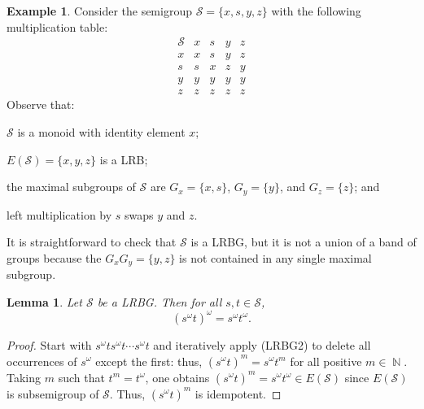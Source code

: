 \documentclass[11pt, oneside, reqno]{amsart}
\newtheorem{lemma}[theorem]{Lemma}
\theoremstyle{definition}
\newtheorem{example}[theorem]{Example}
\numberwithin{equation}{section}
\DeclareMathOperator{\NN}{\mathbb{N}}
\def \SS{{\mathcal{S}}}
\begin{document}
\begin{example}
    \label{ex:not-strict}
    Consider the semigroup $\SS = \{x, s, y, z\}$ with the following multiplication table:
    \begin{equation*}
        \begin{array}{c|cccc}
            \SS & x & s & y & z \\ \hline
            x & x & s & y & z \\
            s & s & x & z & y \\
            y & y & y & y & y \\
            z & z & z & z & z
        \end{array}
    \end{equation*}
    Observe that:
    \begin{enumerate*}[label=(\roman*)]
        \item
            $\SS$ is a monoid with identity element $x$;

        \item
            $E(\SS) = \{x, y, z\}$ is a LRB;

        \item
            the maximal subgroups of $\SS$ are
            $G_{x} = \{x, s\}$, $G_{y} = \{y\}$, and $G_{z} = \{z\}$; and

        \item
            left multiplication by $s$ swaps $y$ and $z$.
    \end{enumerate*}
    It is straightforward to check that $\SS$ is a LRBG, but it is not a union
    of a band of groups because the $G_{x} G_{y} = \{y, z\}$ is not contained in
    any single maximal subgroup.
\end{example}

\begin{lemma}
    Let $\SS$ be a LRBG. Then for all $s, t \in \SS$,
    \begin{equation}
        \label{(s^omega-t)^omega}
        (s^\omega t)^\omega = s^\omega t^\omega.
    \end{equation}
\end{lemma}

\begin{proof}
    Start with $s^\omega t s^\omega t \cdots s^\omega t$
    and iteratively apply (LRBG2) to delete all occurrences of $s^\omega$
    except the first: thus, $(s^\omega t)^m = s^\omega t^m$ for all positive $m
    \in \NN$.
    Taking $m$ such that $t^m = t^\omega$, one obtains
    $(s^\omega t)^m = s^\omega t^\omega \in E(\SS)$
    since $E(\SS)$ is subsemigroup of $\SS$.
    Thus, $(s^\omega t)^m$ is idempotent.
\end{proof}
\end{document}
